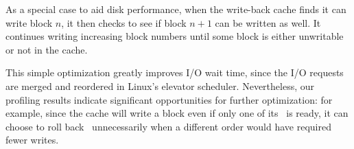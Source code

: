 As a special case to aid disk performance, when the write-back cache finds
it can write block $n$, it then checks to see if block $n+1$ can be written as
well.
%
It continues writing increasing block numbers until some block is either
unwritable or not in the cache.
%
\begin{comment}
The block itself is also marked \PInfst, so that only
one version of its data will be in flight at a time. (This whole procedure is
basically the buffer cache \textit{Write block} action.)
\end{comment}
%
This simple optimization greatly improves I/O wait time, since the I/O
requests are merged and reordered in Linux's elevator scheduler.
%
Nevertheless, our profiling results indicate significant opportunities for
further optimization: for example, since the cache will write a block even
if only one of its \patches\ is ready, it can choose to roll back
\patches\ unnecessarily when a different order would have required fewer
writes.


\begin{comment}
Each \patch\ on a cached block may or may not be visible to a given \module.
For example, \modules\ that respond to user requests generally view the most
current state of every block -- the block with all \patches\ applied. However, a
write-back cache may choose to write some \patches\ on a block while reverting
others, since those others currently have outstanding dependencies. In this
case, \modules\ below the write-back cache (i.e. closer to the disk) should view
those \patches\ in the reverted state. \Kudos\ provides a block revisioning
library function that automatically rolls back those \patches\ that should not
be visible at a particular \module, and then rolls them forward again after that
\module\ is done with the block.
\end{comment}
